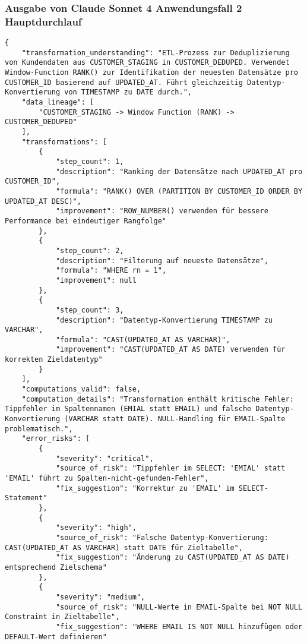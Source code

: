 \subsubsection{Ausgabe von Claude Sonnet 4 Anwendungsfall 2 Hauptdurchlauf}\label{anhang:subsubsec:claude_case2_prompt1}
\begin{lstlisting}[caption={Ausgabe: Claude Sonnet 4 Anwendungsfall 2 Hauptdurchlauf},label={claude_case2_prompt1}]
{
    "transformation_understanding": "ETL-Prozess zur Deduplizierung von Kundendaten aus CUSTOMER_STAGING in CUSTOMER_DEDUPED. Verwendet Window-Function RANK() zur Identifikation der neuesten Datensätze pro CUSTOMER_ID basierend auf UPDATED_AT. Führt gleichzeitig Datentyp-Konvertierung von TIMESTAMP zu DATE durch.",
    "data_lineage": [
        "CUSTOMER_STAGING -> Window Function (RANK) -> CUSTOMER_DEDUPED"
    ],
    "transformations": [
        {
            "step_count": 1,
            "description": "Ranking der Datensätze nach UPDATED_AT pro CUSTOMER_ID",
            "formula": "RANK() OVER (PARTITION BY CUSTOMER_ID ORDER BY UPDATED_AT DESC)",
            "improvement": "ROW_NUMBER() verwenden für bessere Performance bei eindeutiger Rangfolge"
        },
        {
            "step_count": 2,
            "description": "Filterung auf neueste Datensätze",
            "formula": "WHERE rn = 1",
            "improvement": null
        },
        {
            "step_count": 3,
            "description": "Datentyp-Konvertierung TIMESTAMP zu VARCHAR",
            "formula": "CAST(UPDATED_AT AS VARCHAR)",
            "improvement": "CAST(UPDATED_AT AS DATE) verwenden für korrekten Zieldatentyp"
        }
    ],
    "computations_valid": false,
    "computation_details": "Transformation enthält kritische Fehler: Tippfehler im Spaltennamen (EMIAL statt EMAIL) und falsche Datentyp-Konvertierung (VARCHAR statt DATE). NULL-Handling für EMAIL-Spalte problematisch.",
    "error_risks": [
        {
            "severity": "critical",
            "source_of_risk": "Tippfehler im SELECT: 'EMIAL' statt 'EMAIL' führt zu Spalten-nicht-gefunden-Fehler",
            "fix_suggestion": "Korrektur zu 'EMAIL' im SELECT-Statement"
        },
        {
            "severity": "high",
            "source_of_risk": "Falsche Datentyp-Konvertierung: CAST(UPDATED_AT AS VARCHAR) statt DATE für Zieltabelle",
            "fix_suggestion": "Änderung zu CAST(UPDATED_AT AS DATE) entsprechend Zielschema"
        },
        {
            "severity": "medium",
            "source_of_risk": "NULL-Werte in EMAIL-Spalte bei NOT NULL Constraint in Zieltabelle",
            "fix_suggestion": "WHERE EMAIL IS NOT NULL hinzufügen oder DEFAULT-Wert definieren"

\end{lstlisting}
